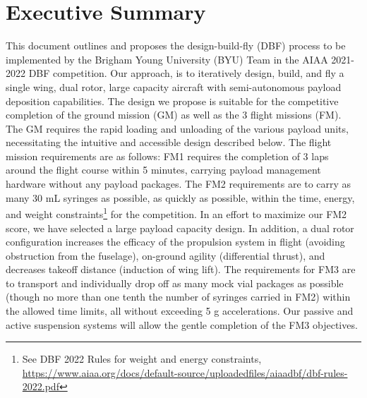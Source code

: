 
\section{Executive Summary} %
\label{sec:ExecutiveSummary}

This document outlines and proposes the design-build-fly (DBF) process to be implemented by the Brigham Young University (BYU) Team in the AIAA 2021-2022 DBF competition.  
Our approach, is to iteratively design, build, and fly a single wing, dual rotor, large capacity aircraft with semi-autonomous payload deposition capabilities. 
The design we propose is suitable for the competitive completion of the ground mission (GM) as well as the 3 flight missions (FM). The GM requires the rapid loading and unloading of the various payload units, necessitating the intuitive and accessible design described below. The flight mission requirements are as follows: FM1 requires the completion of 3 laps around the flight course within 5 minutes, carrying payload management hardware without any payload packages. The FM2 requirements are to carry as many 30 mL syringes as possible, as quickly as possible, within the time, energy, and weight constraints\footnote{See DBF 2022 Rules for weight and energy constraints, \url{https://www.aiaa.org/docs/default-source/uploadedfiles/aiaadbf/dbf-rules-2022.pdf}} for the competition. In an effort to maximize our FM2 score, we have selected a large payload capacity design. In addition, a dual rotor configuration increases the efficacy of the propulsion system in flight (avoiding obstruction from the fuselage), on-ground agility (differential thrust), and decreases takeoff distance (induction of wing lift). The requirements for FM3 are to transport and individually drop off as many mock vial packages as possible (though no more than one tenth the number of syringes carried in FM2) within the allowed time limits, all without exceeding 5 g accelerations. Our passive and active suspension systems will allow the gentle completion of the FM3 objectives.
